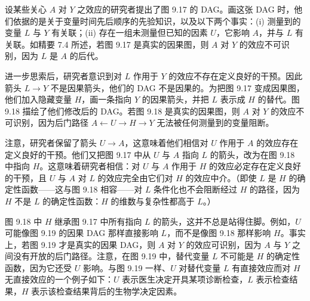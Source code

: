 \begin{finepoint}[从非因果图到因果图]
设某些关心 $A$ 对 $Y$ 之效应的研究者提出了图 9.17 的 DAG。画这张 DAG 时，他们依据的是关于变量时间先后顺序的先验知识，以及以下两个事实：(i) 测量到的变量 $L$ 与 $Y$ 有关联；(ii) 存在一组未测量但已知的因素 $U$，它影响 $A$，并与 $L$ 有关联。如精要 7.4 所述，若图 9.17 是真实的因果图，则 $A$ 对 $Y$ 的效应不可识别，因为 $L$ 是 $A$ 的后代。

进一步思索后，研究者意识到对 $L$ 作用于 $Y$ 的效应不存在定义良好的干预。因此箭头 $L\rightarrow Y$ 不是因果箭头，他们的 DAG 不是因果的。为把图 9.17 变成因果图，他们加入隐藏变量 $H$，画一条指向 $Y$ 的因果箭头，并把 $L$ 表示成 $H$ 的替代。图 9.18 描绘了他们修改后的 DAG。若图 9.18 是真实的因果图，则 $A$ 对 $Y$ 的效应不可识别，因为后门路径 $A\leftarrow U\rightarrow H\rightarrow Y$ 无法被任何测量到的变量阻断。

注意，研究者保留了箭头 $U\rightarrow A$，这意味着他们相信对 $U$ 作用于 $A$ 的效应存在定义良好的干预。他们又把图 9.17 中从 $U$ 与 $A$ 指向 $L$ 的箭头，改为在图 9.18 中指向 $H$。这意味着研究者相信：对 $U$ 与 $A$ 作用于 $H$ 的效应必定存在定义良好的干预，且 $U$ 与 $A$ 对 $L$ 的效应完全由它们对 $H$ 的效应中介。（即使 $L$ 是 $H$ 的确定性函数——这与图 9.18 相容——对 $L$ 条件化也不会阻断经过 $H$ 的路径，因为 $H$ 不是 $L$ 的确定性函数：$H$ 的维数与复杂性都高于 $L$。）

图 9.18 中 $H$ 继承图 9.17 中所有指向 $L$ 的箭头，这并不总是站得住脚。例如，$U$ 可能像图 9.19 的因果 DAG 那样直接影响 $L$，而不是像图 9.18 那样影响 $H$。事实上，若图 9.19 才是真实的因果 DAG，则 $A$ 对 $Y$ 的效应可识别，因为 $A$ 与 $Y$ 之间没有开放的后门路径。注意，在图 9.19 中，替代变量 $L$ 不可能是 $H$ 的确定性函数，因为它还受 $U$ 影响。与图 9.19 一样、$U$ 对替代变量 $L$ 有直接效应而对 $H$ 无直接效应的一个例子如下：$U$ 表示医生决定开具某项诊断检查，$L$ 表示检查结果，$H$ 表示该检查结果背后的生物学决定因素。
\end{finepoint}
